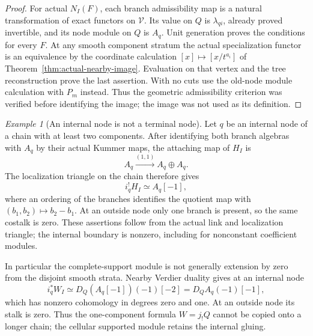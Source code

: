 \documentclass[11pt]{article}
\theoremstyle{definition}
\theoremstyle{remark}
\newtheorem{example}[theorem]{Example}
\begin{document}
\begin{proof}
For actual $N_I(F)$, each branch admissibility map is a natural
transformation of exact functors on $\mathcal V$.  Its value on $Q$
is $\lambda_{qi}$, already proved invertible, and its node module on
$Q$ is $A_q$.  Unit generation proves the conditions for every $F$.
At any smooth component stratum the actual specialization functor is
an equivalence by the coordinate calculation $[x]\mapsto[x/t^{a_i}]$
of Theorem~\ref{thm:actual-nearby-image}.  Evaluation on that vertex
and the tree reconstruction prove the last assertion.  With no cuts
use the old-node module calculation with $P_m$ instead.  Thus the
geometric admissibility criterion was verified before identifying
the image; the image was not used as its definition.
\end{proof}

\begin{example}[An internal node is not a terminal node]
\label{ex:internal-cell}
Let $q$ be an internal node of a chain with at least two components.
After identifying both branch algebras with $A_q$ by their actual
Kummer maps, the attaching map of $H_I$ is
\[
 A_q\xrightarrow{(1,1)}A_q\oplus A_q.
\]
The localization triangle on the chain therefore gives
\[
 i_q^!H_I\simeq A_q[-1],
\]
where an ordering of the branches identifies the quotient map with
$(b_1,b_2)\mapsto b_2-b_1$.  At an outside node only one branch is
present, so the same costalk is zero.  These assertions follow from
the actual link and localization triangle; the internal boundary is
nonzero, including for nonconstant coefficient modules.

In particular the complete-support module is not generally extension
by zero from the disjoint smooth strata.  Nearby Verdier duality gives
at an internal node
\[
 i_q^*W_I\simeq D_Q(A_q[-1])(-1)[-2]
                  =D_QA_q(-1)[-1],
\]
which has nonzero cohomology in degrees zero and one.  At an outside
node its stalk is zero.  Thus the one-component formula
$W=j_!Q$ cannot be copied onto a longer chain; the cellular supported
module retains the internal gluing.
\end{example}
\end{document}
